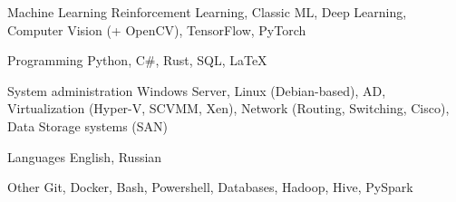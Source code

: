 

\begin{cvskills}

  \cvskill
    {Machine Learning} %
    {Reinforcement Learning, Classic ML, Deep Learning, Computer Vision (+ OpenCV), TensorFlow, PyTorch} %

  \cvskill
    {Programming} %
    {Python, C\#, Rust, SQL, LaTeX} %
    
  \cvskill
	{System administration} %
	{Windows Server, Linux (Debian-based), AD, Virtualization (Hyper-V, SCVMM, Xen), Network (Routing, Switching, Cisco), Data Storage systems (SAN)} %

  \cvskill
    {Languages} %
    {English, Russian} %

  \cvskill
	{Other} %
	{Git, Docker, Bash, Powershell, Databases, Hadoop, Hive, PySpark} %

\end{cvskills}
